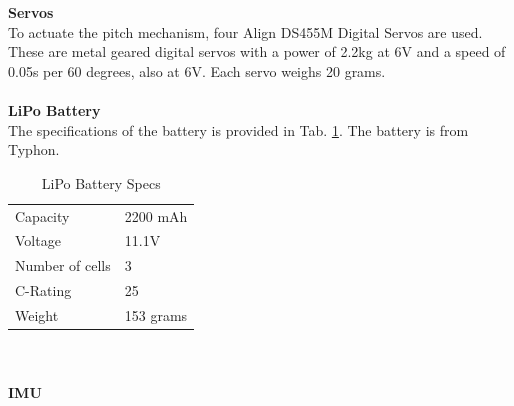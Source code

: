 \textbf{Servos}\\
To actuate the pitch mechanism, four Align DS455M Digital Servos are used. These are metal geared digital servos with a power of 2.2kg at 6V and a speed of 0.05s per 60 degrees, also at 6V. Each servo weighs 20 grams. 
\\\\

\textbf{LiPo Battery}\\
The specifications of the battery is provided in Tab. \ref{tab:lipospecs}. The battery is from Typhon. 
\begin{table}[H]
    \begin{center}
    \caption{LiPo Battery Specs} 
    \label{tab:lipospecs} 
        \begin{tabular}{|l|l|}
            \hline 
                Capacity & 2200 mAh \\
                Voltage & 11.1V \\
                Number of cells & 3 \\
                C-Rating & 25 \\
                Weight & 153 grams \\
            \hline
        \end{tabular}
    \end{center}
\end{table}
\\\\

\textbf{IMU}\\

\\\\


\newpage
